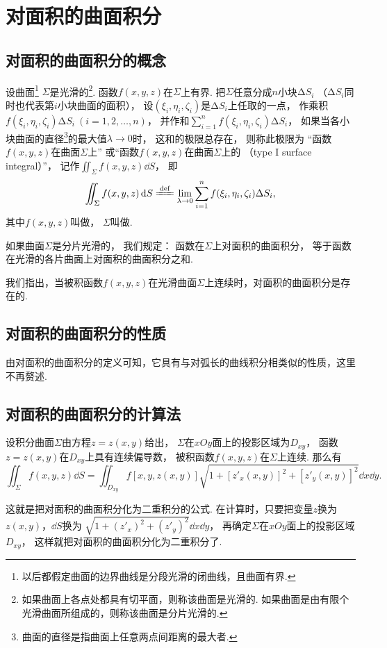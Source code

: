\section{对面积的曲面积分}
\subsection{对面积的曲面积分的概念}
\begin{definition}
设曲面\footnote{以后都假定曲面的边界曲线是分段光滑的闭曲线，且曲面有界.}%
\(\Sigma\)是光滑的\footnote{如果曲面上各点处都具有切平面，则称该曲面是光滑的.
如果曲面是由有限个光滑曲面所组成的，则称该曲面是分片光滑的.}.
函数\(f(x,y,z)\)在\(\Sigma\)上有界.
把\(\Sigma\)任意分成\(n\)小块\(\increment S_i\)
（\(\increment S_i\)同时也代表第\(i\)小块曲面的面积），
设\((\xi_i,\eta_i,\zeta_i)\)是\(\increment S_i\)上任取的一点，
作乘积\(f(\xi_i,\eta_i,\zeta_i) \increment S_i\ (i=1,2,\dotsc,n)\)，
并作和\(\sum\limits_{i=1}^n f(\xi_i,\eta_i,\zeta_i) \increment S_i\)，
如果当各小块曲面的直径\footnote{%
曲面的直径是指曲面上任意两点间距离的最大者.}的最大值\(\lambda\to0\)时，
这和的极限总存在，
则称此极限为
“函数\(f(x,y,z)\)在曲面\(\Sigma\)上”
或“函数\(f(x,y,z)\)在曲面\(\Sigma\)上的%
（type I surface integral）”，
记作\(\iint_\Sigma f(x,y,z) \dd{S}\)，
即\[
	\iint_\Sigma f(x,y,z)\dd{S}
	\defeq
	\lim\limits_{\lambda\to0} \sum\limits_{i=1}^n f(\xi_i,\eta_i,\zeta_i) \increment S_i,
\]
其中\(f(x,y,z)\)叫做，
\(\Sigma\)叫做.

如果曲面\(\Sigma\)是分片光滑的，
我们规定：
函数在\(\Sigma\)上对面积的曲面积分，
等于函数在光滑的各片曲面上对面积的曲面积分之和.
\end{definition}
我们指出，当被积函数\(f(x,y,z)\)在光滑曲面\(\Sigma\)上连续时，对面积的曲面积分是存在的.

\subsection{对面积的曲面积分的性质}
由对面积的曲面积分的定义可知，它具有与对弧长的曲线积分相类似的性质，这里不再赘述.

\subsection{对面积的曲面积分的计算法}
\begin{theorem}
设积分曲面\(\Sigma\)由方程\(z=z(x,y)\)给出，
\(\Sigma\)在\(xOy\)面上的投影区域为\(D_{xy}\)，
函数\(z=z(x,y)\)在\(D_{xy}\)上具有连续偏导数，
被积函数\(f(x,y,z)\)在\(\Sigma\)上连续.
那么有\[
	\iint_\Sigma f(x,y,z) \dd{S}
	=\iint_{D_{xy}} f[x,y,z(x,y)] \sqrt{1+[z'_x(x,y)]^2+[z'_y(x,y)]^2} \dd{x}\dd{y}.
\]
\end{theorem}
这就是把对面积的曲面积分化为二重积分的公式.
在计算时，只要把变量\(z\)换为\(z(x,y)\)，\(\dd{S}\)换为
\(\sqrt{1+(z'_x)^2+(z'_y)^2} \dd{x}\dd{y}\)，
再确定\(\Sigma\)在\(xOy\)面上的投影区域\(D_{xy}\)，
这样就把对面积的曲面积分化为二重积分了.

